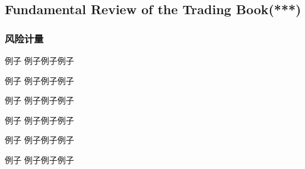 \subsection{ Fundamental Review of the Trading Book(***)}
\subsubsection{风险计量}










\begin{example}{例子}
    例子例子例子
\end{example}

\begin{boxa}{例子}
    例子例子例子
\end{boxa}

\begin{knowledgebox}{例子}
    例子例子例子
\end{knowledgebox}



\begin{skillbox}{例子}
    例子例子例子
\end{skillbox}

\begin{theorembox}{例子}
    例子例子例子
\end{theorembox}


\begin{note}{例子}
    例子例子例子
\end{note}

